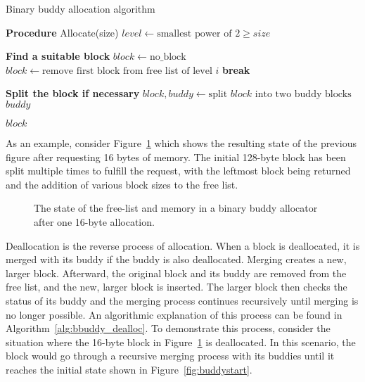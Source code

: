 \begin{algorithm}[h]
  \caption{Binary buddy allocation algorithm}
  \label{alg:bbuddy_alloc}
  \begin{algorithmic}[1]
    \Statex \textbf{Procedure} Allocate(size)
    \State $level \gets \text{smallest power of 2} \geq size$

    \Statex \textbf{Find a suitable block}
    \State $block \gets \text{no\_block}$
    \State $block \gets \text{remove first block from free list of level } i$
    \State \textbf{break}
    \EndIf
    \EndFor

    \State \Return {}
    \EndIf

    \Statex \textbf{Split the block if necessary}
    \State $block, buddy \gets \text{split } block \text{ into two buddy blocks}$
    \State {} $buddy$ 
    \EndWhile

    \State \Return $block$
  \end{algorithmic}
\end{algorithm}

As an example, consider Figure~\ref{fig:buddysplit} which shows the resulting state of the previous figure after requesting 16 bytes of memory. The initial 128-byte block has been split multiple times to fulfill the request, with the leftmost block being returned and the addition of various block sizes to the free list.

\begin{figure}[h]
  \centering
  
  \caption{The state of the free-list and memory in a binary buddy allocator after one 16-byte allocation.}
  \label{fig:buddysplit}
\end{figure}

Deallocation is the reverse process of allocation. When a block is deallocated, it is merged with its buddy if the buddy is also deallocated. Merging creates a new, larger block. Afterward, the original block and its buddy are removed from the free list, and the new, larger block is inserted. The larger block then checks the status of its buddy and the merging process continues recursively until merging is no longer possible. An algorithmic explanation of this process can be found in Algorithm~\ref{alg:bbuddy_dealloc}. To demonstrate this process, consider the situation where the 16-byte block in Figure~\ref{fig:buddysplit} is deallocated. In this scenario, the block would go through a recursive merging process with its buddies until it reaches the initial state shown in Figure~\ref{fig:buddystart}.


